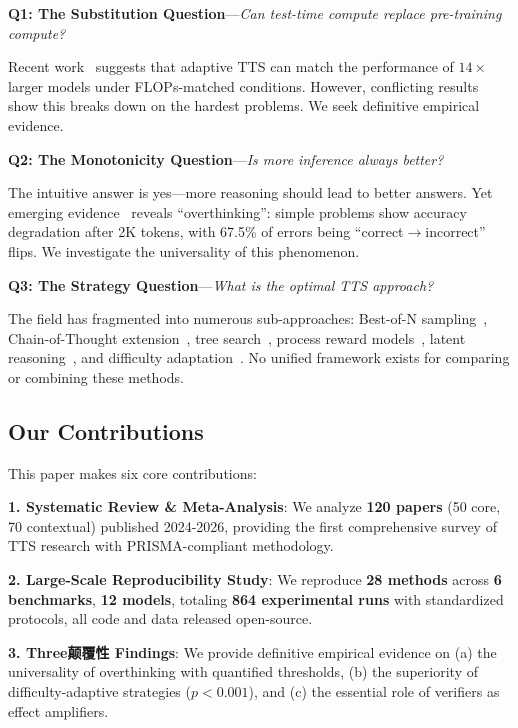 \documentclass[10pt,preprint]{neurips_2024}
\begin{document}
\textbf{Q1: The Substitution Question}---\textit{Can test-time compute replace pre-training compute?}

Recent work~\cite{sn2024scaling} suggests that adaptive TTS can match the performance of $14\times$ larger models under FLOPs-matched conditions. However, conflicting results~\cite{sn2024chinchilla} show this breaks down on the hardest problems. We seek definitive empirical evidence.

\textbf{Q2: The Monotonicity Question}---\textit{Is more inference always better?}

The intuitive answer is yes---more reasoning should lead to better answers. Yet emerging evidence~\cite{sn2024overthinking} reveals ``overthinking'': simple problems show accuracy degradation after 2K tokens, with 67.5\% of errors being ``correct$\rightarrow$incorrect'' flips. We investigate the universality of this phenomenon.

\textbf{Q3: The Strategy Question}---\textit{What is the optimal TTS approach?}

The field has fragmented into numerous sub-approaches: Best-of-N sampling~\cite{carbon2024}, Chain-of-Thought extension~\cite{wei2022chain}, tree search~\cite{yao2024tree}, process reward models~\cite{uemura2024process}, latent reasoning~\cite{sn2024latent}, and difficulty adaptation~\cite{sn2024dast}. No unified framework exists for comparing or combining these methods.

\subsection{Our Contributions}

This paper makes six core contributions:

\textbf{1. Systematic Review \& Meta-Analysis}: We analyze \textbf{120 papers} (50 core, 70 contextual) published 2024-2026, providing the first comprehensive survey of TTS research with PRISMA-compliant methodology.

\textbf{2. Large-Scale Reproducibility Study}: We reproduce \textbf{28 methods} across \textbf{6 benchmarks}, \textbf{12 models}, totaling \textbf{864 experimental runs} with standardized protocols, all code and data released open-source.

\textbf{3. Three颠覆性 Findings}: We provide definitive empirical evidence on (a) the universality of overthinking with quantified thresholds, (b) the superiority of difficulty-adaptive strategies ($p < 0.001$), and (c) the essential role of verifiers as effect amplifiers.
\end{document}
